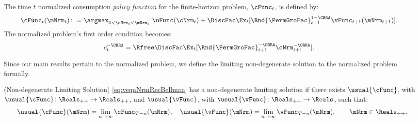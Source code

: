 \documentclass[\econtexRoot/BufferStockTheory]{subfiles}
\begin{document}
The time $t$ normalized consumption \textit{policy function} for the finite-horizon problem, $\cFunc_{t}$, is defined by:
%
\begin{equation}\label{eq:cfunceq1}
  \begin{aligned}
    \cFunc_{t}(\mNrm_{t})\colon & = \argmax_{0<\cNrm_{t}< \mNrm_{t}}~  \uFunc(\cNrm_{t}) +\DiscFac \Ex_{t}[\Rnd{\PermGroFac}_{t+1}^{1-\CRRA}\vFunc_{t+1}(\mNrm_{t+1} )].
  \end{aligned}
\end{equation}
% 
The normalized problem's first order condition becomes:
\begin{equation}\begin{gathered}\begin{aligned}
  c_{t}^{-\CRRA}  & = \Rfree \DiscFac \Ex_{t}[ \Rnd{\PermGroFac}_{t+1}^{-\CRRA} \cNrm_{t+1}^{-\CRRA}].  \label{eq:scaledeuler}
\end{aligned}\end{gathered}\end{equation}

\hypertarget{sensible}{}\hypertarget{useful}{}
\hypertarget{Definition-of-a-Nondegenerate-Solution and Bellman}{}
Since our main results pertain to the normalized problem, we define the limiting non-degenerate solution to the normalized problem formally.

\begin{definition}\label{def:nondegeneracy}(Non-degenerate Limiting Solution)
\ref{eq:veqnNrmRecBellman} has a non-degenerate limiting solution if there exists $ \usual{\cFunc}$, with $\usual{\cFunc}\colon \Reals_{++}\rightarrow \Reals_{++}$, and $ \usual{\vFunc}$, with $\usual{\vFunc}\colon \Reals_{++}\rightarrow \Reals$, such that:
%
\begin{equation}\begin{gathered}\begin{aligned}
  \usual{\cFunc}(\mNrm) =  \lim_{n \rightarrow \infty} \cFunc_{T-n}(\mNrm), \quad \usual{\vFunc}(\mNrm)  =  \lim_{n \rightarrow \infty} \vFunc_{T-n}(\mNrm), \qquad \mNrm \in \Reals_{++} \notag.
\end{aligned}\end{gathered}\end{equation}
\end{definition}


\hypertarget{Stationary-Bellman-Operator}{}
\end{document}
